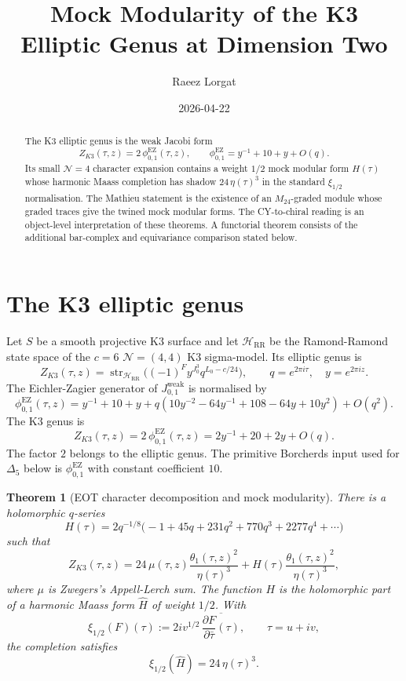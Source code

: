 \documentclass[11pt]{article}
\title{Mock Modularity of the K3 Elliptic Genus at Dimension Two}
\author{Raeez Lorgat}
\date{2026-04-22}
\newtheorem{theorem}{Theorem}[section]
\newcommand{\str}{\operatorname{str}}
\newcommand{\xiop}{\xi_{1/2}}
\begin{document}
\maketitle

\begin{abstract}
The K3 elliptic genus is the weak Jacobi form
\[
  Z_{K3}(\tau,z)=2\,\phi_{0,1}^{\mathrm{EZ}}(\tau,z),
  \qquad
  \phi_{0,1}^{\mathrm{EZ}}=y^{-1}+10+y+O(q).
\]
Its small $\mathcal N=4$ character expansion contains a weight
$1/2$ mock modular form $H(\tau)$ whose harmonic Maass completion
has shadow $24\,\eta(\tau)^3$ in the standard $\xi_{1/2}$ normalisation.
The Mathieu statement is the existence of an $M_{24}$-graded module
whose graded traces give the twined mock modular forms. The
CY-to-chiral reading is an object-level interpretation of these
theorems. A functorial theorem consists of the additional bar-complex
and equivariance comparison stated below.
\end{abstract}

\tableofcontents

\section{The K3 elliptic genus}
\label{sec:k3-elliptic-genus}

Let $S$ be a smooth projective K3 surface and let
$\mathcal H_{\mathrm{RR}}$ be the Ramond-Ramond state space of the
$c=6$ $\mathcal N=(4,4)$ K3 sigma-model. Its elliptic genus is
\[
  Z_{K3}(\tau,z)=
  \str_{\mathcal H_{\mathrm{RR}}}
  \bigl((-1)^F y^{J_0^3}q^{L_0-c/24}\bigr),
  \qquad
  q=e^{2\pi i\tau},\quad y=e^{2\pi iz}.
\]
The Eichler-Zagier generator of $J^{\mathrm{weak}}_{0,1}$ is
normalised by
\[
  \phi_{0,1}^{\mathrm{EZ}}(\tau,z)
  =y^{-1}+10+y+q(10y^{-2}-64y^{-1}+108-64y+10y^2)+O(q^2).
\]
The K3 genus is
\[
  Z_{K3}(\tau,z)=2\,\phi_{0,1}^{\mathrm{EZ}}(\tau,z)
  =2y^{-1}+20+2y+O(q).
\]
The factor $2$ belongs to the elliptic genus. The primitive
Borcherds input used for $\Delta_5$ below is
$\phi_{0,1}^{\mathrm{EZ}}$ with constant coefficient $10$.

\begin{theorem}[EOT character decomposition and mock modularity]
\label{thm:eot-mock-modularity}
There is a holomorphic $q$-series
\[
  H(\tau)
  =2q^{-1/8}\bigl(-1+45q+231q^2+770q^3+2277q^4+\cdots\bigr)
\]
such that
\[
  Z_{K3}(\tau,z)
  =
  24\,\mu(\tau,z)\frac{\theta_1(\tau,z)^2}{\eta(\tau)^3}
  +
  H(\tau)\frac{\theta_1(\tau,z)^2}{\eta(\tau)^3},
\]
where $\mu$ is Zwegers's Appell-Lerch sum. The function $H$ is the
holomorphic part of a harmonic Maass form $\widehat H$ of weight
$1/2$. With
\[
  \xiop(F)(\tau):=2iv^{1/2}\,
  \overline{\frac{\partial F}{\partial \bar\tau}(\tau)},
  \qquad \tau=u+iv,
\]
the completion satisfies
\[
  \xiop(\widehat H)=24\,\eta(\tau)^3 .
\]
\end{theorem}
\end{document}
